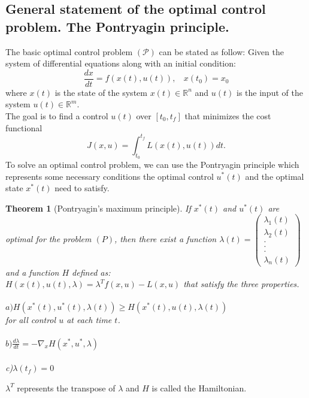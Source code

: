 \documentclass[12pt]{article}
\newtheorem{theorem}{Theorem}
\begin{document}
\subsection{General statement of the optimal control problem. The Pontryagin principle.}
The basic optimal control problem $(\mathcal{P})$ can be stated as follow:
Given the system of differential equations along with an initial condition: 
\begin{equation}
    \frac{dx}{dt}=f(x(t),u(t)) ,\ \ \ \  x(t_0)=x_0
\end{equation}
where $x(t)$ is the state of the system $x(t)\in {\mathbb R}^n$ and $u(t)$ is the input of the system $u(t)\in {\mathbb R}^m.$\\
The goal is to find a control $u(t)$  over $[t_0, t_f]$
that minimizes the cost functional
$$J(x,u)=\int_{t_0}^{t_f}L(x(t),u(t))dt.$$
To solve an optimal control problem, we can use the Pontryagin principle which represents some necessary conditions the optimal control $u^*(t)$ and the optimal state $x^*(t)$ need to satisfy.
\begin{theorem}[Pontryagin's maximum  principle]
If $x^*(t)$ and $u^*(t)$ are optimal for the problem $(P)$, then there exist a function $\lambda(t)=\left(\begin{array}{c}{\lambda}_1(t)\\
{\lambda}_2(t)\\
.\\
.\\
.\\
{\lambda_n(t)} \end{array}\right)$ and a  function 
$H$ defined as: \\
$ H(x(t), u(t), \lambda)= {\lambda}^T f(x,u)-L(x,u)$ that satisfy the three properties.\\
  \\
$a)H(x^*(t),u^*(t),\lambda(t))\geq  H(x^*(t),u(t),\lambda(t))$\\
for all control $u$ at each time $t$.\\
 \\
$ b) \frac{d\lambda}{dt}=-\nabla_x H(x^*,u^*,\lambda)$\\
  \\
c)$ \lambda (t_f )=0$\\


    
\end{theorem}
$\lambda^T$ represents the transpose of $\lambda$ and $H$ is called the Hamiltonian.\\
\end{document}

